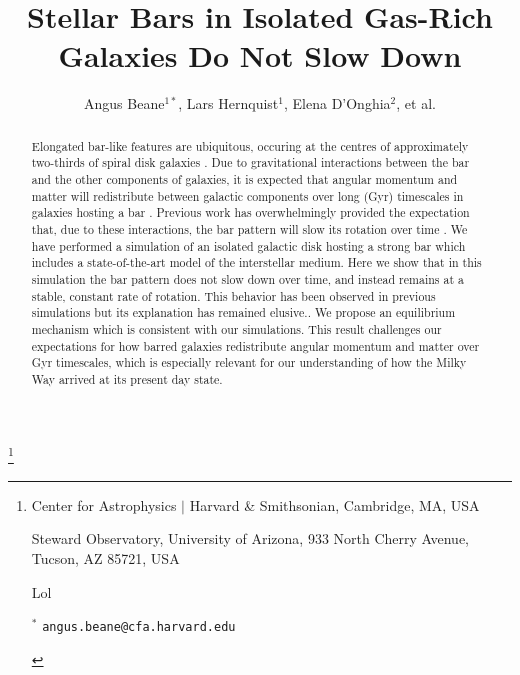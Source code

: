 \documentclass{natureprintstyle}
\title{Stellar Bars in Isolated Gas-Rich Galaxies Do Not Slow Down}
\author{Angus Beane$^{1*}$, Lars Hernquist$^1$, Elena D'Onghia$^2$, et al.}
\begin{document}
\maketitle

\let\thefootnote\relax\footnote{

\begin{affiliations}
\item Center for Astrophysics $|$ Harvard \& Smithsonian,  Cambridge, MA, USA

\item Steward Observatory, University of Arizona, 933 North Cherry Avenue, Tucson, AZ 85721, USA

\item Lol

$^{*}$ \texttt{\mbox{angus.beane@cfa.harvard.edu}}

\end{affiliations}
}

\vspace{-3.5mm}
\begin{abstract}
  
  Elongated bar-like features are ubiquitous, occuring at the centres of
  approximately two-thirds of spiral disk galaxies \cite{2000AJ....119..536E,
  2007ApJ...657..790M}. Due to gravitational interactions between the bar and
  the other components of galaxies, it is expected that angular momentum and
  matter will redistribute between galactic components over long (Gyr)
  timescales in galaxies hosting a bar \cite{1972MNRAS.157....1L,
  1984MNRAS.209..729T, 1985MNRAS.213..451W}. Previous work has overwhelmingly
  provided the expectation that, due to these interactions, the bar pattern
  will slow its rotation over time \cite{1992ApJ...400...80H,
  2000ApJ...543..704D, 2002MNRAS.330...35A, 2002ApJ...569L..83A,
  2003MNRAS.341.1179A, 2003MNRAS.346..251O, 2005MNRAS.363..991H,
  2006ApJ...637..214M, 2007MNRAS.375..460W, 2009ApJ...697..293D}. We have
  performed a simulation of an isolated galactic disk hosting a strong bar
  which includes a state-of-the-art model of the interstellar medium. Here we
  show that in this simulation the bar pattern does not slow down over time,
  and instead remains at a stable, constant rate of rotation. This behavior
  has been observed in previous simulations but its explanation has remained
  elusive.\cite{1993AA...268...65F, 2010ApJ...719.1470V}. We propose an
  equilibrium mechanism which is consistent with our simulations. This result
  challenges our expectations for how barred galaxies redistribute angular
  momentum and matter over Gyr timescales, which is especially relevant for
  our understanding of how the Milky Way arrived at its present day state.
  
\end{abstract}
\end{document}
